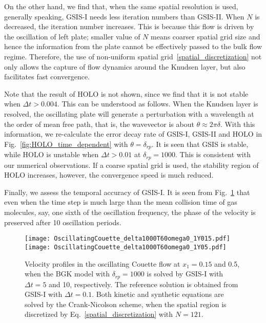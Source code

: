 \documentclass[onefignum,onetabnum]{siamart171218}
\begin{document}
On the other hand, we find that, when the same spatial resolution is used, generally speaking, GSIS-I needs less iteration numbers than GSIS-II. When $N$ is decreased, the iteration number increases. This is because this flow is driven by the oscillation of left plate; smaller value of $N$ means coarser spatial grid size and hence the information from the plate cannot be effectively passed to the bulk flow regime. Therefore, the use of non-uniform spatial grid~\eqref{spatial_discretization} not only allows the capture of flow dynamics around the Knudsen layer, but also facilitates fast convergence.


Note that the result of HOLO is not shown, since we find that it is not stable when $\Delta{t}>0.004$. This can be understood as follows. When the Knudsen layer is resolved, the oscillating plate will generate a perturbation with a wavelength at the order of mean free path, that is, the wavevector is about $\theta\approx2\pi\delta$. With this information, we re-calculate the error decay rate of GSIS-I, GSIS-II and HOLO in Fig.~\ref{fig:HOLO_time_dependent} with $\theta=\delta_{rp}$. It is seen that GSIS is stable, while HOLO is unstable when $\Delta{t}>0.01$ at $\delta_{rp}=1000$. This is consistent with our numerical observations. If a coarse spatial grid is used, the stability region of HOLO increases, however, the convergence speed is much reduced.  


Finally, we assess the temporal accuracy of GSIS-I. It is seen from Fig.~\ref{fig:Couette_time} that even when the time step is much large than the mean collision time of gas molecules, say, one sixth of the oscillation frequency, the phase of the velocity is preserved after 10 oscillation periods. 

\begin{figure}[t]
	\centering
	\texttt{[image: OscillatingCouette\_delta1000T60omega0\_1Y015.pdf]}
	\texttt{[image: OscillatingCouette\_delta1000T60omega0\_1Y05.pdf]}
	\caption{
		Velocity profiles in the oscillating Couette flow at $x_1=0.15$ and 0.5, when the BGK model with $\delta_{rp}=1000$ is solved by GSIS-I with $\Delta{t}=5$ and 10, respectively. The reference solution is obtained from GSIS-I with  $\Delta{t}=0.1$. Both kinetic and synthetic equations are solved by the Crank-Nicolson scheme, when the spatial region is discretized by Eq.~\eqref{spatial_discretization} with $N=121$.   
	}
	\label{fig:Couette_time}
\end{figure}


\end{document}
